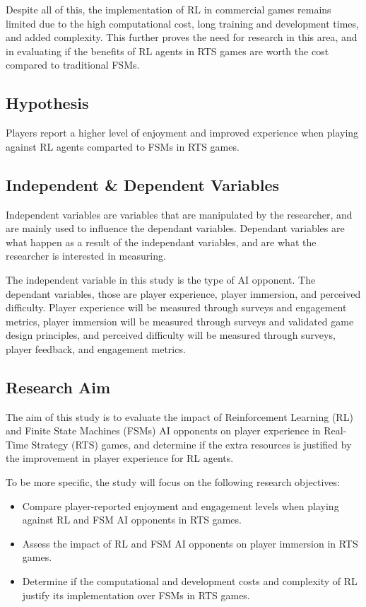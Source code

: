 \documentclass[conference]{IEEEtran}
\begin{document}
Despite all of this, the implementation of RL in commercial games remains limited due to the high computational cost, long training and development times, and added complexity. 
This further proves the need for research in this area, and in evaluating if the benefits of RL agents in RTS games are worth the cost compared to traditional FSMs.

\subsection{Hypothesis}

Players report a higher level of enjoyment and improved experience when playing against RL agents comparted to FSMs in RTS games.

\subsection{Independent \& Dependent Variables}

Independent variables are variables that are manipulated by the researcher, and are mainly used to influence the dependant variables. Dependant variables are what happen as a result of the independant variables,
and are what the researcher is interested in measuring.

The independent variable in this study is the type of AI opponent. The dependant variables, those are player experience, player immersion, and perceived difficulty.
Player experience will be measured through surveys and engagement metrics, player immersion will be measured through surveys and validated game design principles, and perceived difficulty will be measured through 
surveys, player feedback, and engagement metrics.

\subsection{Research Aim}

The aim of this study is to evaluate the impact of Reinforcement Learning (RL) and Finite State Machines (FSMs) AI opponents on player experience in Real-Time Strategy (RTS) games, and determine if the extra resources
is justified by the improvement in player experience for RL agents.

To be more specific, the study will focus on the following research objectives:

\begin{itemize}
    \item Compare player-reported enjoyment and engagement levels when playing against RL and FSM AI opponents in RTS games.
    \item Assess the impact of RL and FSM AI opponents on player immersion in RTS games.
    \item Determine if the computational and development costs and complexity of RL justify its implementation over FSMs in RTS games.
\end{itemize}
\end{document}
